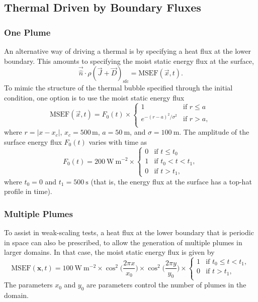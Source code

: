\documentclass{report}
\begin{document}
\subsection{Thermal Driven by Boundary Fluxes}

\subsubsection{One Plume}
An alternative way of driving a thermal is by specifying a heat flux at the lower boundary. This amounts to specifying the moist static energy flux at the surface,
\begin{equation}
    \vec{\hat n} \cdot \rho (\vec{J} + \vec{D})_\mathrm{sfc} = \mathrm{MSEF}(\vec{x}, t).
\end{equation}
To mimic the structure of the thermal bubble specified through the initial condition, one option is to use the moist static energy flux
\begin{equation}
     \mathrm{MSEF}(\vec{x}, t) =  F_0(t) \times \left\{ \begin{array}{ll}
 1 & \text{if } r \leq a\\
 e^{-(r - a)^2/\sigma^2} & \text{if } r > a,\\
\end{array} \right.
\end{equation}
where $r = |x-x_{c}|$, $x_c = 500\,\mathrm{m}$, $a=50~\mathrm{m}$, and $\sigma = 100~\mathrm{m}$. The amplitude of the surface energy flux $F_0(t)$ varies with time as
\begin{equation}
   F_0(t) =
   200~\mathrm{W~m^{-2}}\times 
   \left\{ \begin{array}{ll}
 0 & \text{if } t \leq t_0\\
 1 & \text{if } t_0 < t < t_1,\\
 0 & \text{if } t > t_1,
 \end{array}\right.
\end{equation}
where $t_0=0$ and $t_1 = 500~\mathrm{s}$ (that is, the energy flux at the surface has a top-hat profile in time). 

\subsubsection{Multiple Plumes}

To assist in weak-scaling tests, a heat flux at the lower boundary that is periodic in space can also be prescribed, to allow the generation of multiple plumes in larger domains. In that case, the moist static energy flux is given by
\begin{equation}
\mathrm{MSEF}(\mathbf{x},t) = 
   100~\mathrm{W~m^{-2}}\times \cos^2{\Big(\frac{2\pi x}{x_{0}}\Big)}\times \cos^2{\Big(\frac{2\pi y}{y_{0}}\Big)} \times
   \left\{ \begin{array}{ll}
    1 & \text{if } t_0 \leq t < t_1,\\
    0 & \text{if } t > t_1, \\
     \end{array}\right.
\end{equation}
The parameters $x_{0}$ and $y_{0}$ are parameters control the number of plumes in the domain.  
\end{document}

